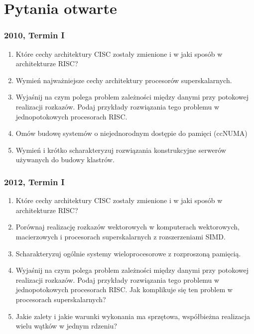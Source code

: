 
\newpage
\part{Pytania otwarte}
	\section{2010, Termin I}
		\begin{enumerate}
			\item Które cechy architektury CISC zostały zmienione i w jaki sposób w architekturze RISC?
			\item Wymień najważniejsze cechy architektury procesorów superskalarnych.
			\item Wyjaśnij na czym polega problem zależności między danymi przy potokowej realizacji rozkazów. Podaj przykłady rozwiązania tego problemu w jednopotokowych procesorach RISC.
			\item Omów budowę systemów o niejednorodnym dostępie do pamięci (ccNUMA)
			\item Wymień i krótko scharakteryzuj rozwiązania konstrukcyjne serwerów używanych do budowy klastrów.
		\end{enumerate}
	\section{2012, Termin I}
	\begin{enumerate}
		\item Które cechy architektury CISC zostały zmienione i w jaki sposób w architekturze RISC?
		\item Porównaj realizację rozkazów wektorowych w komputerach wektorowych, macierzowych i procesorach superskalarnych z rozszerzeniami SIMD.
		\item Scharakteryzuj ogólnie systemy wieloprocesorowe z rozproszoną pamięcią.
		\item Wyjaśnij na czym polega problem zależności między danymi przy potokowej realizacji rozkazów. Podaj przykłady rozwiązania tego problemu w jednopotokowych procesorach RISC. Jak komplikuje się ten problem w procesorach superskalarnych?
		\item Jakie zalety i jakie warunki wykonania ma sprzętowa, współbieżna realizacja wielu wątków w jednym rdzeniu?
	\end{enumerate}
		